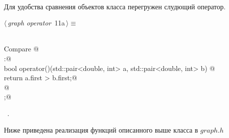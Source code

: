 \documentclass[12pt]{article}
\begin{document}
\paragraph{}
Для удобства сравнения объектов класса перегружен слудющий оператор.
\begin{flushleft} \small
\begin{minipage}{\linewidth}\label{scrap20}\raggedright\small
{} $\langle\,${\itshape graph operator}\nobreak\ {\footnotesize {11a}}$\,\rangle\equiv$
\vspace{-1ex}
\begin{list}{}{} \item
\mbox{}\verb@@\\
\mbox{}\verb@class Compare {@\\
\mbox{}\verb@public:@\\
\mbox{}\verb@    bool operator()(std::pair<double, int> a, std::pair<double, int> b) {@\\
\mbox{}\verb@        return a.first > b.first;@\\
\mbox{}\verb@    }@\\
\mbox{}\verb@};@\\
\mbox{}\verb@@{\NWsep}
\end{list}
\vspace{-1.5ex}
\footnotesize
\begin{list}{}{\setlength{\itemsep}{-\parsep}\setlength{\itemindent}{-\leftmargin}}
\item \NWtxtMacroRefIn\ .

\item{}
\end{list}
\end{minipage}\vspace{4ex}
\end{flushleft}
Ниже приведена реализация функций описанного выше класса в $graph.h$
\end{document}
